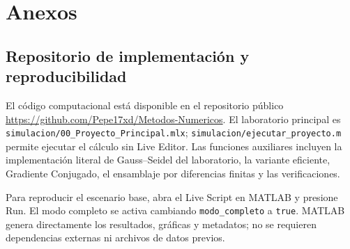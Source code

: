 \clearpage
\appendix
\section{Anexos}

\subsection{Repositorio de implementaci\'on y reproducibilidad}

El c\'odigo computacional est\'a disponible en el repositorio p\'ublico \url{https://github.com/Pepe17xd/Metodos-Numericos}. El laboratorio principal es \texttt{simulacion/00\_Proyecto\_Principal.mlx}; \texttt{simulacion/ejecutar\_proyecto.m} permite ejecutar el c\'alculo sin Live Editor. Las funciones auxiliares incluyen la implementaci\'on literal de Gauss--Seidel del laboratorio, la variante eficiente, Gradiente Conjugado, el ensamblaje por diferencias finitas y las verificaciones.

Para reproducir el escenario base, abra el Live Script en MATLAB y presione Run. El modo completo se activa cambiando \texttt{modo\_completo} a \texttt{true}. MATLAB genera directamente los resultados, gr\'aficas y metadatos; no se requieren dependencias externas ni archivos de datos previos.
